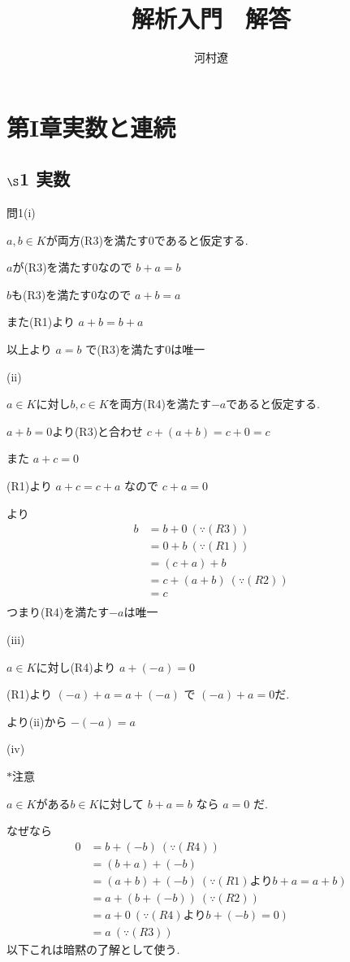 \documentclass{jsarticle}
\title{解析入門　解答}
\author{河村遼}
\begin{document}
\maketitle{}
\section*{第I章実数と連続}
\subsection*{$\S$1 実数}
問1(i)

$a,b\in K$が両方(R3)を満たす0であると仮定する.

$a$が(R3)を満たす$0$なので
$b+a=b$

$b$も(R3)を満たす$0$なので
$a+b=a$

また(R1)より
$a+b=b+a$


以上より
$a=b$
で(R3)を満たす0は唯一


(ii)

$a\in K$に対し$b,c\in K$を両方(R4)を満たす$-a$であると仮定する.

$a+b = 0$より(R3)と合わせ
$c+(a+b)=c+0=c$

また
$a+c=0$


(R1)より
$a+c=c+a$
なので
$c+a=0$


より
\begin{align*}
b &= b+0 \ (\because (R3))\\
&= 0+b \ (\because (R1))\\
&= (c+a)+b\\
&= c+(a+b) \ (\because (R2))\\
&= c \\
\end{align*}
つまり(R4)を満たす$-a$は唯一


(iii)

$a\in K$に対し(R4)より
$a+(-a)=0$


(R1)より
$(-a)+a=a+(-a)$
で
$(-a)+a=0$だ.

より(ii)から
$-(-a)=a$

(iv)

$\ast$注意

$a\in K$がある$b\in K$に対して
$b+a=b$
なら
$a=0$
だ.

なぜなら
\begin{align*}
0 &= b+(-b) \ (\because (R4))\\
&= (b+a)+(-b)\\
&= (a+b)+(-b) \ (\because (R1) より b+a=a+b)\\
&= a+(b+(-b)) \ (\because (R2))\\
&= a+0 \ (\because (R4) より b+(-b)=0)\\
&= a \ (\because (R3))
\end{align*}
以下これは暗黙の了解として使う.
\end{document}
